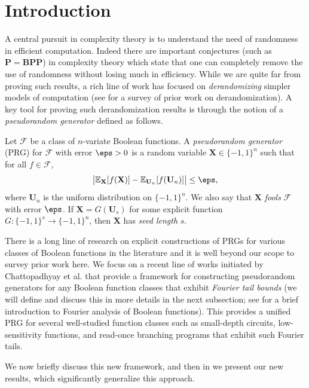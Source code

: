 \section{Introduction}
A central pursuit in complexity theory is to understand the need of randomness in efficient computation. Indeed there are important conjectures (such as $\mathbf{P}=\mathbf{BPP}$) in complexity theory which state that one can completely remove the use of randomness without losing much in efficiency. While we are quite far from proving such results, a rich line of work has focused on \emph{derandomizing} simpler models of computation (see \cite{vadhan2012pseudorandomness} for a survey of prior work on derandomization). A key tool for proving such derandomization results is through the notion of a \emph{pseudorandom generator} defined as follows.
\begin{definition}\label{def:prg}
Let $\mathcal{F}$ be a class of $n$-variate Boolean functions. A \emph{pseudorandom generator} (PRG) for $\mathcal{F}$ with error $\eps>0$ is a random variable $\mathbf{X}\in \{-1,1\}^n$ such that for all $f\in \mathcal{F}$,
\begin{equation*}
    \bigl| \mathbb{E}_{\mathbf{X}}[f(\mathbf{X})]-\mathbb{E}_{\mathbf{U}_n}[f(\mathbf{U}_n)] \bigr| \leq \eps,
\end{equation*}
where $\mathbf{U}_n$ is the uniform distribution on $\{-1,1\}^n$.  We also say that $\mathbf{X}$ \emph{fools} $\mathcal{F}$ with error $\eps$.  If $\mathbf{X}=G(\mathbf{U}_s)$ for some explicit function $G:\{-1,1\}^s\to \{-1,1\}^n$, then $\mathbf{X}$ has \emph{seed length} $s$.
\end{definition} 
There is a long line of research on explicit constructions of PRGs for various classes of Boolean functions in the literature and it is well beyond our scope to survey prior work here. We focus on a recent line of works initiated by Chattopadhyay {et al.} \cite{CHHL, CHLT} that provide a framework for constructing pseudorandom generators for any Boolean function classes that exhibit \emph{Fourier tail bounds} (we will define and discuss this in more details in the next subsection; see  for a brief introduction to Fourier analysis of Boolean functions). This provides a unified PRG for several well-studied function classes such as small-depth circuits, low-sensitivity functions, and read-once branching programs that exhibit such Fourier tails.

We now briefly discuss this new framework, and then in  we present our new results,  which significantly generalize this approach.

